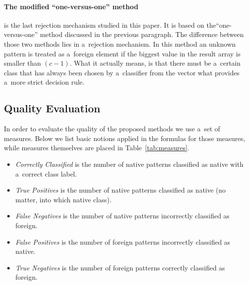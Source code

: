 \documentclass{llncs}
\begin{document}
\paragraph{The modified ``one-versus-one'' method} is the last rejection mechanism studied in this paper. It is based on the``one-versus-one'' method discussed in the previous paragraph. The difference between those two methods lies in a~rejection mechanism. In this method an unknown pattern is treated as a~foreign element if the biggest value in the result array is smaller than $(c-1)$. What it actually means, is that there must be a~certain class that has always been chosen by a~classifier from the vector what provides a~more strict decision rule. 

\subsection{Quality Evaluation}

In order to evaluate the quality of the proposed methods we use a~set of measures. Below we list basic notions applied in the formulas for those measures, while measures themselves are placed in Table~\ref{tab:measures}.
\begin{itemize}
  \item \emph{Correctly Classified} is the number of native patterns classified as native with a~correct class label.
  \item \emph{True Positives} is the number of native patterns classified as native (no matter, into which native class).
  \item \emph{False Negatives} is the number of native patterns incorrectly classified as foreign.
  \item \emph{False Positives} is the number of foreign patterns incorrectly classified as native.
  \item \emph{True Negatives} is the number of foreign patterns correctly classified as foreign.
\end{itemize}  
  
\end{document}

